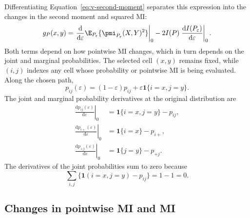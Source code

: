 Differentiating Equation~\eqref{eq:v-second-moment} separates this
expression into the changes in the second moment and squared MI:
\begin{equation}
  g_P(x,y)
  =
  \left.\frac{\mathrm d}{\mathrm d\varepsilon}
  \E_{P_\varepsilon}\{\pmi_{P_\varepsilon}(X,Y)^2\}
  \right|_{0}
  -2I(P)
  \left.\frac{\mathrm d I(P_\varepsilon)}{\mathrm d\varepsilon}
  \right|_{0}.
  \label{eq:g-decomposition}
\end{equation}
Both terms depend on how pointwise MI changes, which in turn depends on
the joint and marginal probabilities. The selected cell \((x,y)\)
remains fixed, while \((i,j)\) indexes any cell whose probability or
pointwise MI is being evaluated. Along the chosen path,
\begin{equation}
  p_{ij}(\varepsilon)
  =(1-\varepsilon)p_{ij}
  +\varepsilon\mathbf 1\{i=x,j=y\}.
\end{equation}
The joint and marginal probability derivatives at the original distribution
are
\begin{align}
  \left.\frac{\mathrm d p_{ij}(\varepsilon)}{\mathrm d\varepsilon}
  \right|_{0}
  &=\mathbf 1\{i=x,j=y\}-p_{ij},
  \label{eq:joint-perturbation-derivative}\\
  \left.\frac{\mathrm d p_{i+}(\varepsilon)}{\mathrm d\varepsilon}
  \right|_{0}
  &=\mathbf 1\{i=x\}-p_{i+},\\
  \left.\frac{\mathrm d p_{+j}(\varepsilon)}{\mathrm d\varepsilon}
  \right|_{0}
  &=\mathbf 1\{j=y\}-p_{+j}.
\end{align}
The derivatives of the joint probabilities sum to zero because
\begin{equation}
  \sum_{i,j}
  \{\mathbf 1(i=x,j=y)-p_{ij}\}
  =1-1=0.
\end{equation}

\subsection{Changes in pointwise MI and MI}

